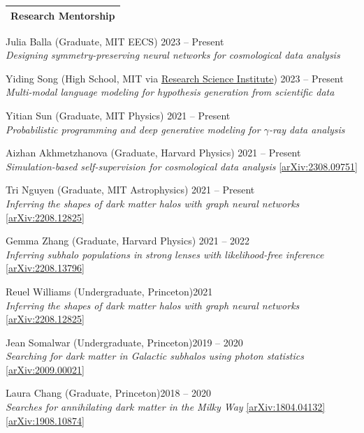 \documentclass[letterpaper,11pt]{article}
\newenvironment{packed_itemize}{
\begin{itemize}[label=\raisebox{0.25ex}{\tiny$\bullet$}]
  \setlength{\itemsep}{4.2pt}
  \setlength{\parskip}{0pt}
  \setlength{\parsep}{0pt}}{\end{itemize}
}
\begin{document}


\noindent
\begin{tabular*}{\textwidth}{l@{\extracolsep{\fill}}}
\large {\sc \Large{Research Mentorship}}\\
\hline
\end{tabular*}\vspace{1.mm}

\begin{packed_itemize}
  \item Julia Balla (Graduate, {MIT EECS}) \hfill 2023 -- Present \\ \emph{Designing symmetry-preserving neural networks for cosmological data analysis}
  \item Yiding Song (High School, {MIT} via \href{https://www.cee.org/programs/research-science-institute}{Research Science Institute}) \hfill 2023 -- Present \\ \emph{Multi-modal language modeling for hypothesis generation from scientific data}
  \item Yitian Sun (Graduate, {MIT Physics}) \hfill 2021 -- Present \\ \emph{Probabilistic programming and deep generative modeling for $\gamma$-ray data analysis}
  \item Aizhan Akhmetzhanova (Graduate, {Harvard Physics}) \hfill 2021 -- Present \\ \emph{Simulation-based self-supervision for cosmological data analysis} \href{https://arxiv.org/abs/2308.09751}{[arXiv:2308.09751]}
  \item Tri Nguyen (Graduate, {MIT Astrophysics}) \hfill 2021 -- Present \\ \emph{Inferring the shapes of dark matter halos with graph neural networks} \href{https://arxiv.org/abs/2208.12825}{[arXiv:2208.12825]}
  \item Gemma Zhang (Graduate, {Harvard Physics}) \hfill 2021 -- 2022 \\ \emph{Inferring subhalo populations in strong lenses with likelihood-free inference} \href{https://arxiv.org/abs/2208.13796}{[arXiv:2208.13796]}
  \item Reuel Williams (Undergraduate, {Princeton})\hfill 2021 \\ \emph{Inferring the shapes of dark matter halos with graph neural networks} \href{https://arxiv.org/abs/2208.12825}{[arXiv:2208.12825]}
  \item Jean Somalwar (Undergraduate, {Princeton})\hfill 2019 -- 2020 \\ \emph{Searching for dark matter in Galactic subhalos using photon statistics} \href{https://arxiv.org/abs/2009.00021}{[arXiv:2009.00021]}
  \item Laura Chang (Graduate, {Princeton})\hfill 2018 -- 2020 \\ \emph{Searches for annihilating dark matter in the Milky Way} \href{https://arxiv.org/abs/1804.04132}{[arXiv:1804.04132]}\,\href{https://arxiv.org/abs/1908.10874}{[arXiv:1908.10874]}
  \end{packed_itemize}
\vspace{2.0mm}
\end{document}

